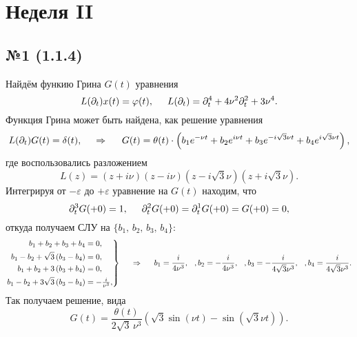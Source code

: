
\section{Неделя II}

\subsection*{№1 (1.1.4)}

Найдём функию Грина $G(t)$ уравнения
\begin{equation*}
    L(\partial_t) x(t) = \varphi(t),
    \hspace{5 mm} 
    L(\partial_t) = \partial_t^4 + 4 \nu^2 \partial_t^2 + 3 \nu^4.
\end{equation*}
Функция Грина может быть найдена, как решение уравнения
\begin{equation*}
    L(\partial_t) G(t) = \delta(t),
    \hspace{0.5cm} \Rightarrow \hspace{0.5cm} 
    G(t) = \theta(t) \cdot \left(b_1 e^{-\nu t} + b_2 e^{i \nu t} + b_3 e^{- i \sqrt{3} \nu t} + b_4 e^{i \sqrt{3} \nu t}\right),
\end{equation*}
где воспользовались разложением
\begin{equation*}
    L(z) = (z + i \nu) (z- i \nu) (z - i \sqrt{3} \nu) (z + i \sqrt{3} \nu).
\end{equation*}
Интегрируя от $-\varepsilon$ до $+\varepsilon$ уравнение на $G(t)$ находим, что
\begin{equation*}
    \partial_t^3 G(+0)  = 1, \hspace{5 mm} \partial_t^2 G(+0) = \partial_t^1 G(+0) = G(+0) = 0,
\end{equation*}
откуда получаем СЛУ на $\{b_1,\, b_2,\, b_3,\, b_4\}$:
\begin{equation*}
    \left.\begin{aligned}
        b_1+b_2+b_3+b_4 &=0, \\ 
        b_1-b_2+\sqrt{3} \left(b_3-b_4\right)  &=0, \\
        b_1+b_2+3 \left(b_3+b_4\right)  &=0, \\
        b_1-b_2+3 \sqrt{3} \left(b_3-b_4\right)  &=-\tfrac{i}{ \nu^3}, \\
    \end{aligned}\right\}
    \hspace{0.5cm} \Rightarrow \hspace{0.5cm}
    b_1 = \frac{i}{4 \nu^3}, \hspace{2.5 mm}, 
    b_2 = -\frac{i}{4 \nu^3}, \hspace{2.5 mm},
    b_3 = -\frac{i}{4 \sqrt{3} \nu^3}, \hspace{2.5 mm},
    b_4 = \frac{i}{4 \sqrt{3} \nu^3}.
\end{equation*}
Так получаем решение, вида
\begin{equation*}
    G(t) = \frac{\theta(t)}{2 \sqrt{3}\,  \nu^3} \left(
        \sqrt{3}  \sin(\nu t) - \sin(\sqrt{3} \nu t)
    \right).
\end{equation*}






